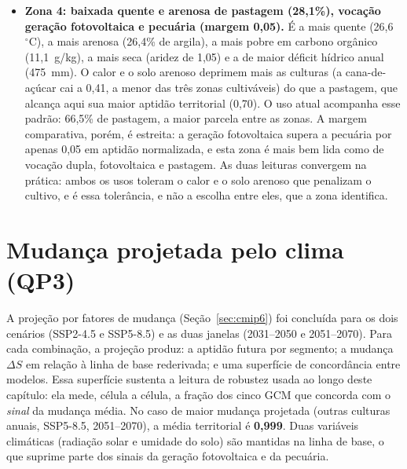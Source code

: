 \begin{itemize}
    dominado por pastagem (58,1\%), com soja residual (7,9\%). É a divergência entre potencial e
    uso atual mais acentuada do zoneamento (Seção~\ref{sec:realized}).
  \item \textbf{Zona 4: baixada quente e arenosa de pastagem (28,1\%), vocação geração
    fotovoltaica e pecuária (margem 0,05).} É a mais quente (26,6~$^\circ$C), a mais arenosa
    (26,4\% de argila), a mais pobre em carbono orgânico (11,1~g/kg), a mais seca (aridez de 1,05)
    e a de maior déficit hídrico anual (475~mm). O calor e o solo arenoso deprimem mais as culturas
    (a cana-de-açúcar cai a 0,41, a menor das três zonas cultiváveis) do que a pastagem, que
    alcança aqui sua maior aptidão territorial (0,70). O uso atual acompanha esse padrão: 66,5\% de
    pastagem, a maior parcela entre as zonas. A margem comparativa, porém, é estreita: a geração
    fotovoltaica supera a pecuária por apenas 0,05 em aptidão normalizada, e esta zona é mais bem lida
    como de vocação dupla, fotovoltaica e pastagem. As duas leituras convergem na prática: ambos os
    usos toleram o calor e o solo arenoso que penalizam o cultivo, e é essa tolerância, e não a
    escolha entre eles, que a zona identifica.
\end{itemize}

\section{Mudança projetada pelo clima (QP3)}\label{sec:shift}

A projeção por fatores de mudança (Seção~\ref{sec:cmip6}) foi concluída para os dois cenários
(SSP2-4.5 e SSP5-8.5) e as duas janelas (2031--2050 e 2051--2070). Para cada combinação, a projeção
produz: a aptidão futura por segmento; a mudança $\Delta S$ em relação à linha de base rederivada; e
uma superfície de concordância entre modelos. Essa superfície sustenta a leitura de robustez usada ao
longo deste capítulo: ela mede, célula a célula, a fração dos cinco GCM que concorda com o
\emph{sinal} da mudança média. No caso de maior mudança projetada (outras culturas anuais, SSP5-8.5,
2051--2070), a média territorial é \textbf{0,999}. Duas
variáveis climáticas (radiação solar e umidade do solo) são mantidas na linha de base, o que suprime
parte dos sinais da geração fotovoltaica e da pecuária.

